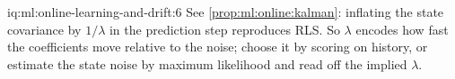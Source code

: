 \begin{solution}{iq:ml:online-learning-and-drift:6}
See \cref{prop:ml:online:kalman}: inflating the state covariance by $1/\lambda$ in the prediction step reproduces RLS. So
$\lambda$ encodes how fast the coefficients move relative to the noise; choose it by scoring on history, or estimate the
state noise by maximum likelihood and read off the implied $\lambda$.
\end{solution}
